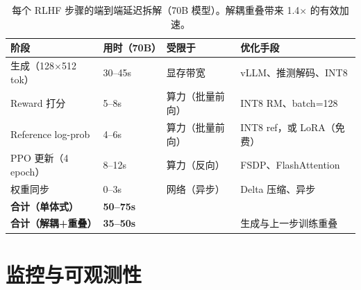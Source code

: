 \begin{table}[ht!]
\centering
\small
\caption{每个 RLHF 步骤的端到端延迟拆解（70B 模型）。解耦重叠带来 1.4$\times$ 的有效加速。}
\begin{tabularx}{\linewidth}{@{}Z{0.8} Z{0.55} Z{0.65} Z{2}@{}}
\toprule
\textbf{阶段} & \textbf{用时（70B）} & \textbf{受限于} & \textbf{优化手段} \\
\midrule
生成（128$\times$512 tok） & 30--45s & 显存带宽 & vLLM、推测解码、INT8 \\
Reward 打分 & 5--8s & 算力（批量前向） & INT8 RM、batch=128 \\
Reference log-prob & 4--6s & 算力（批量前向） & INT8 ref，或 LoRA（免费） \\
PPO 更新（4 epoch） & 8--12s & 算力（反向） & FSDP、FlashAttention \\
权重同步 & 0--3s & 网络（异步） & Delta 压缩、异步 \\
\textbf{合计（单体式）} & \textbf{50--75s} &  &  \\
\textbf{合计（解耦+重叠）} & \textbf{35--50s} &  & 生成与上一步训练重叠 \\
\bottomrule
\end{tabularx}
\end{table}



\section{监控与可观测性}
\label{monitoring-and-observability}

